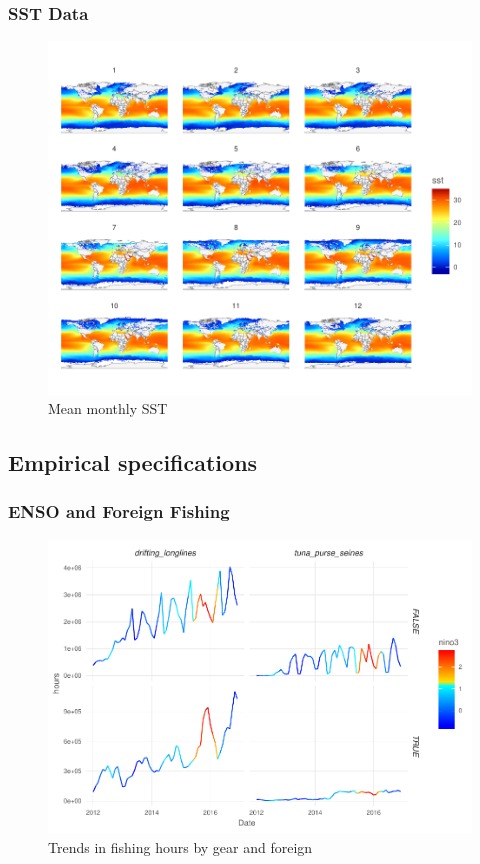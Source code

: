 \documentclass[]{article}
\begin{document}
\subsubsection{SST Data}\label{sst-data}

\begin{figure}
\centering
\includegraphics{Oremus_Villasenor-Derbez_files/figure-latex/unnamed-chunk-6-1.pdf}
\caption{Mean monthly SST}
\end{figure}

\subsection{Empirical specifications}\label{empirical-specifications}

\subsubsection{ENSO and Foreign Fishing}\label{enso-and-foreign-fishing}

\begin{figure}
\centering
\includegraphics{Oremus_Villasenor-Derbez_files/figure-latex/unnamed-chunk-7-1.pdf}
\caption{Trends in fishing hours by gear and foreign}
\end{figure}
\end{document}
